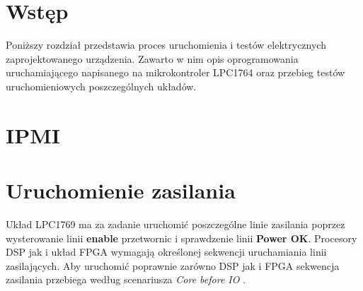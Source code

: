 

\section{Wstęp}
Poniższy rozdział przedstawia proces uruchomienia i testów elektrycznych zaprojektowanego urządzenia. Zawarto w nim opis oprogramowania uruchamiającego napisanego na mikrokontroler LPC1764 oraz przebieg testów uruchomieniowych poszczególnych układów.

\section{IPMI}

\section{Uruchomienie zasilania}

Układ LPC1769 ma za zadanie uruchomić poszczególne linie zasilania poprzez wysterowanie linii \textbf{enable} przetwornic i sprawdzenie linii \textbf{Power OK}. Procesory DSP jak i układ FPGA wymagają określonej sekwencji uruchamiania linii zasilających. Aby uruchomić poprawnie zarówno DSP jak i FPGA sekwencja zasilania przebiega według scenariusza \textit{Core before IO} \cite[page=129]{TMS}. 

